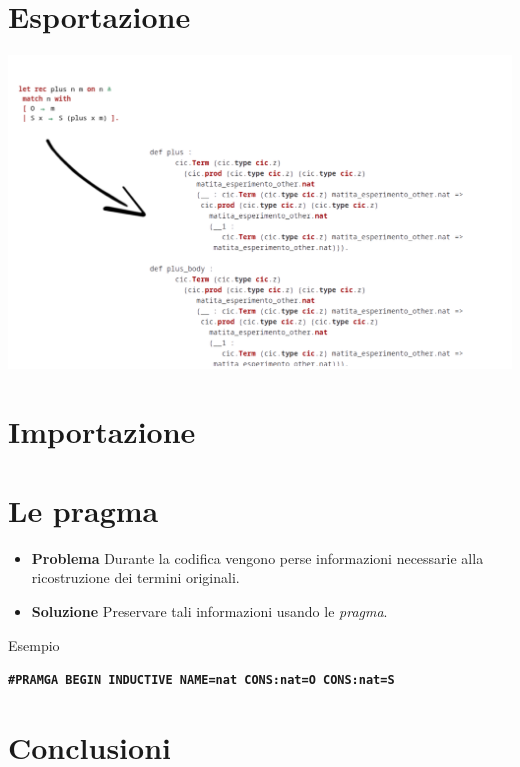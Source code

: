 \documentclass{beamer}
\begin{document}
\section{Esportazione}
\begin{frame}
  \includegraphics[scale=0.30]{export.png}
\end{frame}

\section{Importazione}
\begin{frame}

\end{frame}

\section{Le pragma}
\begin{frame}
\begin{itemize}
  \item \alert{\textbf{Problema}} Durante la codifica vengono perse informazioni necessarie
    alla ricostruzione dei termini originali.
  \vspace{1em}
  \item \alert{\textbf{Soluzione}} Preservare tali informazioni usando le \textit{pragma}.
\end{itemize}
  \vspace{3em}
  \begin{exampleblock}{Esempio}
\begin{center}
  \textbf{\texttt{\#PRAMGA BEGIN INDUCTIVE NAME=nat CONS:nat=O CONS:nat=S}}
\end{center}
  \end{exampleblock}
\end{frame}

\begin{frame}

\end{frame}

\section{Conclusioni}
\begin{frame}
\end{frame}
\end{document}

